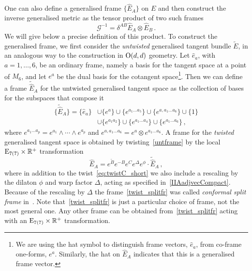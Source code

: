 \documentclass[debug]{phd}
\begin{document}
					One can also define a generalised frame $\{\hat{E}_A\}$ on $E$ and then construct the inverse generalised metric as the tensor product of two such frames
							\begin{equation}\label{genmetfor}
								\mathcal{G}^{-1} = \delta^{AB} \hat{E}_A \otimes \hat{E}_B \,. 
							\end{equation}
					We will give below a precise definition of this product. 
					To construct the generalised frame, we first consider the \emph{untwisted} generalised tangent bundle $\tilde{E}$, in an analogous way to the construction in $\mathrm{O}(d,d)$ geometry.
					Let $\hat e_a$, with $a=1,\ldots,6$, be an ordinary frame, namely a basis for the tangent space at a point of $M_6$, and let $e^a$ be the dual basis for the cotangent space\footnote{%
						We are using the hat symbol to distinguish frame vectors, $\hat{e}_a$, from co-frame one-forms, $e^a$. 
						Similarly, the hat on $\hat E_A$ indicates that this is a generalised frame vector.%
						}.
					Then we can define a frame $\tilde{\hat E}_A$ for the untwisted generalised tangent space as the collection of bases for the subspaces that compose it
							\begin{equation}\label{untframe}
								\begin{split}
									\{ \tilde{\hat{E}}_A\} = \{\hat e_a\} &\cup \{e^a\} \cup \{e^{a_1 \ldots a_5} \} \cup \{e^{a,a_1\ldots a_6}\} \cup \{1\} \\
													&\cup \{e^{a_1a_2}\} \cup \{e^{a_1\ldots a_4}\} \cup \{e^{a_1 \ldots a_6}\}\, ,
								\end{split}
							\end{equation}
					where $e^{a_1\ldots a_p}= e^{a_1}\wedge \cdots \wedge e^{a_p}$ and $e^{a,a_1\ldots a_6} = e^a\otimes e^{a_1\ldots a_6}$. 
					A frame for the \emph{twisted} generalised tangent space is obtained by twisting~\eqref{untframe} by the local $\mathrm{E}_{7(7)}\times \mathbb{R}^+$ transformation
							\begin{equation}\label{twist_splitfr}
								\hat{E}_A = e^{\tilde{B}}e^{-B}e^{C}e^{\Delta}e^{\phi}\cdot \tilde{\hat{E}}_A \, ,
							\end{equation}
					where in addition to the twist~\eqref{eq:twistC_short} we also include a rescaling by the dilaton $\phi$ and warp factor $\Delta$, acting as specified in~\eqref{IIAadjvecCompact}. 
					Because of the rescaling by $\Delta$ the frame~\eqref{twist_splitfr} was called \emph{conformal split frame} in~\cite{Coimbra:2011ky}. 
					Note that~\eqref{twist_splitfr} is just a particular choice of frame, not the most general one. 
					Any other frame can be obtained from~\eqref{twist_splitfr} acting with an $\mathrm{E}_{7(7)} \times \mathbb{R}^+$ transformation. 
\end{document}
